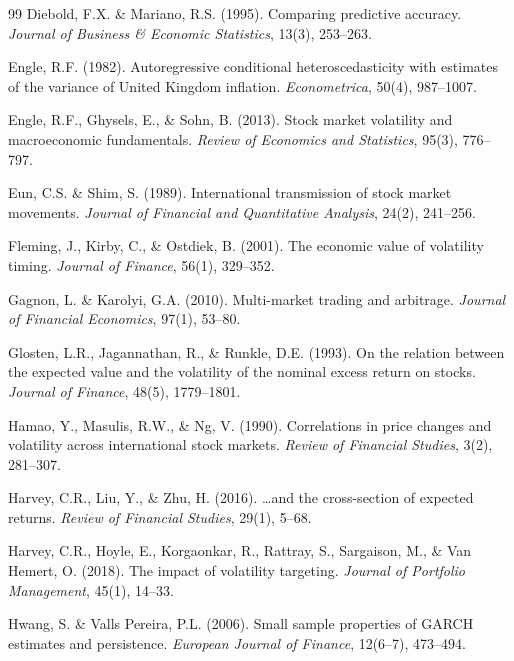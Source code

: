\documentclass[12pt,a4paper]{article}
\begin{document}
\begin{thebibliography}{99}
Diebold, F.X. \& Mariano, R.S. (1995). Comparing predictive accuracy. \textit{Journal of Business \& Economic Statistics}, 13(3), 253--263.

Engle, R.F. (1982). Autoregressive conditional heteroscedasticity with estimates of the variance of United Kingdom inflation. \textit{Econometrica}, 50(4), 987--1007.

Engle, R.F., Ghysels, E., \& Sohn, B. (2013). Stock market volatility and macroeconomic fundamentals. \textit{Review of Economics and Statistics}, 95(3), 776--797.

Eun, C.S. \& Shim, S. (1989). International transmission of stock market movements. \textit{Journal of Financial and Quantitative Analysis}, 24(2), 241--256.

Fleming, J., Kirby, C., \& Ostdiek, B. (2001). The economic value of volatility timing. \textit{Journal of Finance}, 56(1), 329--352.

Gagnon, L. \& Karolyi, G.A. (2010). Multi-market trading and arbitrage. \textit{Journal of Financial Economics}, 97(1), 53--80.

Glosten, L.R., Jagannathan, R., \& Runkle, D.E. (1993). On the relation between the expected value and the volatility of the nominal excess return on stocks. \textit{Journal of Finance}, 48(5), 1779--1801.

Hamao, Y., Masulis, R.W., \& Ng, V. (1990). Correlations in price changes and volatility across international stock markets. \textit{Review of Financial Studies}, 3(2), 281--307.

Harvey, C.R., Liu, Y., \& Zhu, H. (2016). \ldots and the cross-section of expected returns. \textit{Review of Financial Studies}, 29(1), 5--68.

Harvey, C.R., Hoyle, E., Korgaonkar, R., Rattray, S., Sargaison, M., \& Van Hemert, O. (2018). The impact of volatility targeting. \textit{Journal of Portfolio Management}, 45(1), 14--33.

Hwang, S. \& Valls Pereira, P.L. (2006). Small sample properties of GARCH estimates and persistence. \textit{European Journal of Finance}, 12(6--7), 473--494.


\end{thebibliography}
\end{document}
